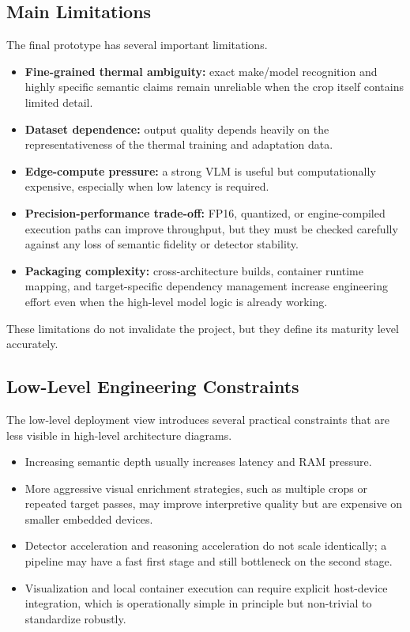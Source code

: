 \subsection{Main Limitations}

The final prototype has several important limitations.

\begin{itemize}[nosep]
  \item \textbf{Fine-grained thermal ambiguity:} exact make/model recognition and highly
    specific semantic claims remain unreliable when the crop itself contains limited detail.
  \item \textbf{Dataset dependence:} output quality depends heavily on the representativeness
    of the thermal training and adaptation data.
  \item \textbf{Edge-compute pressure:} a strong VLM is useful but computationally expensive,
    especially when low latency is required.
  \item \textbf{Precision-performance trade-off:} FP16, quantized, or engine-compiled
    execution paths can improve throughput, but they must be checked carefully against any
    loss of semantic fidelity or detector stability.
  \item \textbf{Packaging complexity:} cross-architecture builds, container runtime mapping,
    and target-specific dependency management increase engineering effort even when the
    high-level model logic is already working.
\end{itemize}

These limitations do not invalidate the project, but they define its maturity level accurately.

\subsection{Low-Level Engineering Constraints}

The low-level deployment view introduces several practical constraints that are less visible in
high-level architecture diagrams.

\begin{itemize}[nosep]
  \item Increasing semantic depth usually increases latency and RAM pressure.
  \item More aggressive visual enrichment strategies, such as multiple crops or repeated target
    passes, may improve interpretive quality but are expensive on smaller embedded devices.
  \item Detector acceleration and reasoning acceleration do not scale identically; a pipeline may
    have a fast first stage and still bottleneck on the second stage.
  \item Visualization and local container execution can require explicit host-device integration,
    which is operationally simple in principle but non-trivial to standardize robustly.
\end{itemize}

